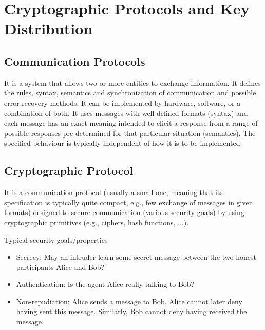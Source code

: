 \chapter{Cryptographic Protocols and Key Distribution}

\section{Communication Protocols}

It is a system that allows two or more entities to exchange information. It defines the rules, syntax, semantics and synchronization of communication and possible error recovery methods. It can be implemented by hardware, software, or a combination of both. It uses messages with well-defined formats (syntax) and each message has an exact meaning intended to elicit a response from a range of possible responses pre-determined for that particular situation (semantics). The specified behaviour is typically independent of how it is to be implemented.

\section{Cryptographic Protocol}

It is a communication protocol (usually a small one, meaning that its specification is typically quite compact, e.g., few exchange of messages in given formats) designed to secure communication (various security goals) by using cryptographic primitives (e.g., ciphers, hash functions, ...).

Typical security goals/properties
\begin{itemize}
	\item Secrecy: May an intruder learn some secret message between the two honest participants Alice and Bob?
	\item Authentication: Is the agent Alice really talking to Bob?
	\item Non-repudiation: Alice sends a message to Bob. Alice cannot later deny having sent this 	message. Similarly, Bob cannot deny having received the message.
\end{itemize}


